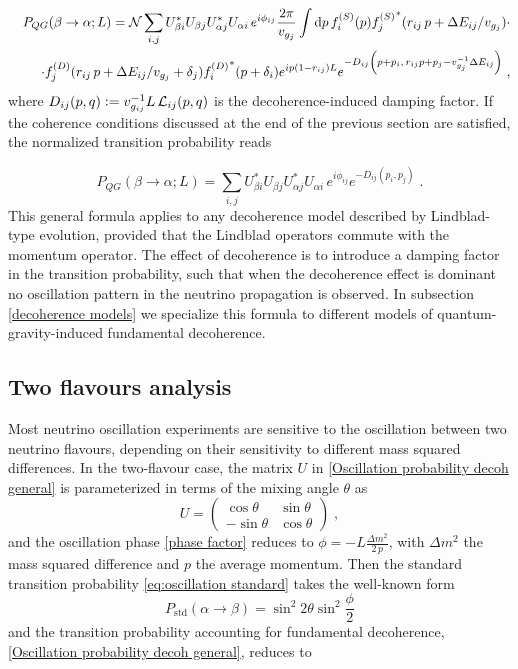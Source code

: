 \documentclass[11pt]{article}
\newcommand{\ebd}{\vcentcolon =}
\newcommand{\inttt}[1]{\int\dd{#1}}
\begin{document}
\begin{eqnarray}
    &&P_{QG}(\beta\to\alpha;L) = \mathcal{N}\sum_{i,j} U^*_{\beta i} U_{\beta j} U^*_{\alpha j} U_{\alpha i} \,e^{i \phi_{ij}} \frac{2\pi}{v_{g_j}}\inttt{p} f_i^{(S)}(p) {f_j^{(S)}}^*(r_{ij}\,p+\Delta E_{ij}/v_{g_j}) \cdot\nonumber \\ &&\cdot f_j^{(D)}(r_{ij}\,p+\Delta E_{ij}/v_{g_j}+\delta_j) {f_i^{(D)}}^*(p+\delta_i) e^{ip(1-r_{ij})L}e^{-D_{ij}\qty(p+p_i,\,r_{ij}p+p_j-v_{g_j}^{-1}\Delta E_{ij})}\;,\label{oscillation probability decohe wave-packet general}
\end{eqnarray}
where $D_{ij}(p,q)\ebd v_{g_{ij}}^{-1}L\,\mathcal{L}_{ij}(p,q)$ is the decoherence-induced damping factor. If the coherence conditions discussed at the end of the previous section are satisfied, the normalized transition probability reads 

\begin{equation}
    P_{QG}(\beta\to\alpha;L) = \sum_{i,j} U^*_{\beta i} U_{\beta j} U^*_{\alpha j} U_{\alpha i} \,e^{i \phi_{ij}} e^{-D_{ij}(p_i,p_j)}\;.\label{Oscillation probability decoh general}
\end{equation}
This general formula applies to any decoherence model described by Lindblad-type evolution, provided that the Lindblad operators commute with the momentum operator.
The effect of decoherence is to introduce a damping factor in the transition probability, such that when the decoherence effect is dominant no oscillation pattern in the neutrino propagation is observed.
In subsection \ref{decoherence models} we specialize this formula to different models of quantum-gravity-induced fundamental decoherence. 

\subsection{Two flavours analysis}
Most neutrino oscillation experiments are sensitive to the oscillation between two neutrino flavours, depending on their sensitivity to different mass squared differences. In the two-flavour case, the matrix $U$ in \eqref{Oscillation probability decoh general} is parameterized in terms of the mixing angle $\theta$ as
\begin{equation}
    U = \begin{pmatrix}
\cos \theta & \sin \theta \\
-\sin \theta & \cos \theta
\end{pmatrix}\;,
\end{equation}
and the oscillation phase \eqref{phase factor} reduces to $\phi= -L\frac{\Delta m^2}{2\,p}$, with $\Delta m^2$ the mass squared difference and $p$ the average momentum.
Then the standard transition probability \eqref{eq:oscillation standard} takes the well-known form
\begin{equation}\label{eq:standard osc 2 flavours}
    P_{\text{std}}(\alpha\to\beta) = \sin^2{2\theta}\sin^2{\frac{\phi}{2}}
\end{equation}
and the transition probability accounting for fundamental decoherence, \eqref{Oscillation probability decoh general}, reduces to
\end{document}
